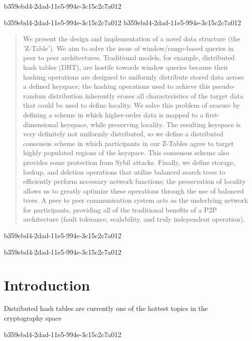 \documentclass[12pt]{article}
\begin{document}
b359ebd4-2dad-11e5-994e-3c15c2c7a012
\maketitle
b359ebd4-2dad-11e5-994e-3c15c2c7a012
b359ebd4-2dad-11e5-994e-3c15c2c7a012\begin{abstract}
We present the design and implementation of a novel data structure (the 'Z-Table'). We aim to solve the issue of window/range-based queries in peer to peer architectures. Traditional models, for example,  distributed hash tables (DHT), are hostile towards window queries because their hashing operations are designed to uniformly distribute stored data across a defined keyspace; the hashing operations used to achieve this pseudo-random distribution inherently erases all characteristics of the target data that could be used to define locality. We solve this problem of erasure by defining a scheme in which higher-order data is mapped to a first-dimensional keyspace, while preserving locality. The resulting keyspace is very definitely not uniformly distributed, so we define a distributed consensus scheme in which participants in our Z-Tables agree to target highly populated regions of the keyspace. This consensus scheme also provides some protection from Sybil attacks. Finally, we define storage, lookup, and deletion operations that utilize balanced search trees to efficiently perform necessary network functions; the preservation of locality allows us to greatly optimize these operations through the use of balanced trees. A peer to peer communication system acts as the underlying network for participants, providing all of the traditional benefits of a P2P architecture (fault tolerance, scalability, and truly independent operation).
\end{abstract}
b359ebd4-2dad-11e5-994e-3c15c2c7a012

b359ebd4-2dad-11e5-994e-3c15c2c7a012\newpage
\section{Introduction}
Distributed hash tables are currently one of the hottest topics in the cryptography space~\cite{Stoica:2001dj,Rowstron:2001ea,Ratnasamy:2001wn}

b359ebd4-2dad-11e5-994e-3c15c2c7a012\printbibliography
\end{document}
